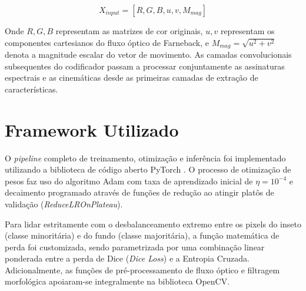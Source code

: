 \begin{equation}
    X_{input} = [R, G, B, u, v, M_{mag}]
\end{equation}

Onde $R, G, B$ representam as matrizes de cor originais, $u, v$ representam os componentes cartesianos do fluxo óptico de Farneback, e $M_{mag} = \sqrt{u^2 + v^2}$ denota a magnitude escalar do vetor de movimento. As camadas convolucionais subsequentes do codificador passam a processar conjuntamente as assinaturas espectrais e as cinemáticas desde as primeiras camadas de extração de características.

\section{Framework Utilizado}
\label{sec:framework}

O \textit{pipeline} completo de treinamento, otimização e inferência foi implementado utilizando a biblioteca de código aberto PyTorch \cite{paszke2019pytorch}. O processo de otimização de pesos faz uso do algoritmo Adam \cite{kingma2014adam} com taxa de aprendizado inicial de $\eta = 10^{-4}$ e decaimento programado através de funções de redução ao atingir platôs de validação (\textit{ReduceLROnPlateau}). 

Para lidar estritamente com o desbalanceamento extremo entre os pixels do inseto (classe minoritária) e do fundo (classe majoritária), a função matemática de perda foi customizada, sendo parametrizada por uma combinação linear ponderada entre a perda de Dice (\textit{Dice Loss}) e a Entropia Cruzada. Adicionalmente, as funções de pré-processamento de fluxo óptico e filtragem morfológica apoiaram-se integralmente na biblioteca OpenCV.